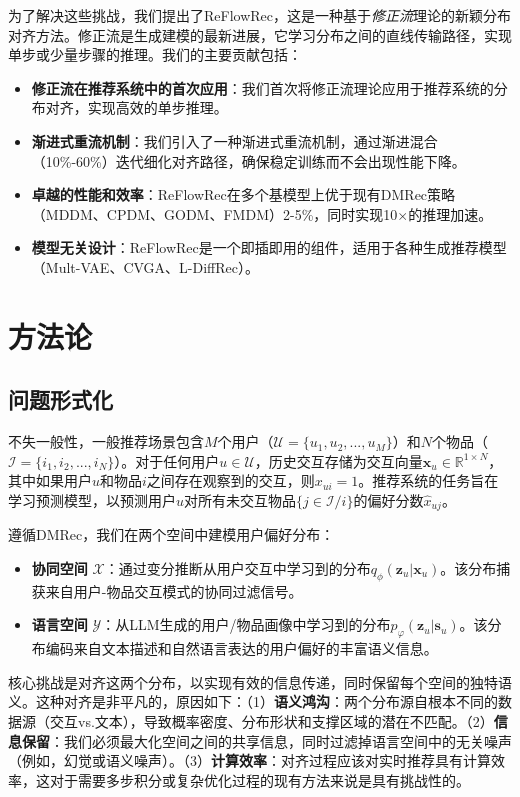 \documentclass[sigconf]{acmart}
\begin{document}
为了解决这些挑战，我们提出了\textsf{ReFlowRec}，这是一种基于\textit{修正流}理论\cite{lipman2023rectified}的新颖分布对齐方法。修正流是生成建模的最新进展，它学习分布之间的直线传输路径，实现单步或少量步骤的推理。我们的主要贡献包括：

\begin{itemize}[leftmargin=*]
\item[$\bullet$] \textbf{修正流在推荐系统中的首次应用}：我们首次将修正流理论应用于推荐系统的分布对齐，实现高效的单步推理。
\item[$\bullet$] \textbf{渐进式重流机制}：我们引入了一种渐进式重流机制，通过渐进混合（10\%-60\%）迭代细化对齐路径，确保稳定训练而不会出现性能下降。
\item[$\bullet$] \textbf{卓越的性能和效率}：ReFlowRec在多个基模型上优于现有DMRec策略（MDDM、CPDM、GODM、FMDM）2-5\%，同时实现10$\times$的推理加速。
\item[$\bullet$] \textbf{模型无关设计}：ReFlowRec是一个即插即用的组件，适用于各种生成推荐模型（Mult-VAE、CVGA、L-DiffRec）。
\end{itemize}

\section{方法论}
\subsection{问题形式化}
不失一般性，一般推荐场景包含$M$个用户（$\mathcal U=\{u_1, u_2, ..., u_M\}$）和$N$个物品（$\mathcal I=\{i_1, i_2, ..., i_N\}$）。对于任何用户$u \in \mathcal U$，历史交互存储为交互向量$\mathbf x_u \in \mathbb R^{1\times N}$，其中如果用户$u$和物品$i$之间存在观察到的交互，则$x_{ui}=1$。推荐系统的任务旨在学习预测模型，以预测用户$u$对所有未交互物品$\{j \in \mathcal I /i\}$的偏好分数$\hat{x}_{uj}$。

遵循DMRec\cite{zhang2024dmrec}，我们在两个空间中建模用户偏好分布：
\begin{itemize}[leftmargin=*]
\item \textbf{协同空间} $\mathcal X$：通过变分推断从用户交互中学习到的分布$q_\phi(\mathbf z_u|\mathbf x_u)$。该分布捕获来自用户-物品交互模式的协同过滤信号。
\item \textbf{语言空间} $\mathcal Y$：从LLM生成的用户/物品画像中学习到的分布$p_\varphi(\mathbf z_u|\mathbf s_u)$。该分布编码来自文本描述和自然语言表达的用户偏好的丰富语义信息。
\end{itemize}

核心挑战是对齐这两个分布，以实现有效的信息传递，同时保留每个空间的独特语义。这种对齐是非平凡的，原因如下：（1）\textbf{语义鸿沟}：两个分布源自根本不同的数据源（交互vs.文本），导致概率密度、分布形状和支撑区域的潜在不匹配。（2）\textbf{信息保留}：我们必须最大化空间之间的共享信息，同时过滤掉语言空间中的无关噪声（例如，幻觉\cite{ji2023survey}或语义噪声\cite{wei2024llmrec}）。（3）\textbf{计算效率}：对齐过程应该对实时推荐具有计算效率，这对于需要多步积分或复杂优化过程的现有方法来说是具有挑战性的。
\end{document}
